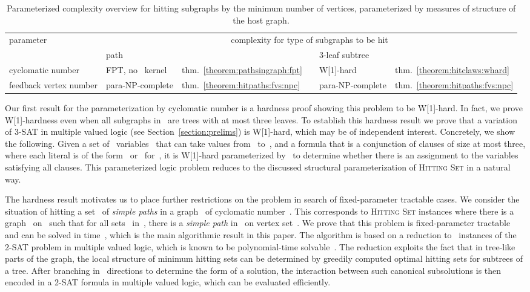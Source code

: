 \let\accentvec\vec  \documentclass{llncs}
\newcommand{\HittingSet}{\textsc{Hitting Set}\xspace}
\begin{document}
\begin{table}[t]
	\caption{Parameterized complexity overview for hitting subgraphs by the minimum number of vertices, parameterized by measures of structure of the host graph. }
	\centering
{
\begin{tabular}{@{}llllll@{}}
\toprule
parameter & \multicolumn{5}{c}{complexity for type of subgraphs to be hit} \\ 
\cmidrule{2-6}
& \multicolumn{2}{l}{path} & \phantom{abc} & \multicolumn{2}{l}{3-leaf subtree} \\ 
\midrule
cyclomatic number & FPT, no~ kernel & thm.~\ref{theorem:pathsingraph:fpt} & & W[1]-hard & thm.~\ref{theorem:hitclaws:whard} \\
feedback vertex number & para-NP-complete & thm.~\ref{theorem:hitpaths:fvs:npc} & & para-NP-complete & thm.~\ref{theorem:hitpaths:fvs:npc} \\
\bottomrule
\end{tabular}
\label{table:summary}
}
\end{table}

Our first result for the parameterization by cyclomatic number is a hardness proof showing this problem to be W[1]-hard. In fact, we prove W[1]-hardness even when all subgraphs in~ are trees with at most three leaves. To establish this hardness result we prove that a variation of 3-SAT in multiple valued logic (see Section~\ref{section:prelims}) is W[1]-hard, which may be of independent interest. Concretely, we show the following. Given a set of~ variables~ that can take values from~ to~, and a formula that is a conjunction of clauses of size at most three, where each literal is of the form~ or~ for~, it is W[1]-hard parameterized by~ to determine whether there is an assignment to the variables satisfying all clauses. This parameterized logic problem reduces to the discussed structural parameterization of \HittingSet in a natural way.

The hardness result motivates us to place further restrictions on the problem in search of fixed-parameter tractable cases. We consider the situation of hitting a set~ of \emph{simple paths} in a graph~ of cyclomatic number~. This corresponds to \HittingSet instances where there is a graph~ on~ such that for all sets~ in~, there is a \emph{simple path} in~ on vertex set~. We prove that this problem is fixed-parameter tractable and can be solved in time~, which is the main algorithmic result in this paper. The algorithm is based on a reduction to~ instances of the 2-SAT problem in multiple valued logic, which is known to be polynomial-time solvable~\cite{BejarHM01,Manya00}. The reduction exploits the fact that in tree-like parts of the graph, the local structure of minimum hitting sets can be determined by greedily computed optimal hitting sets for subtrees of a tree. After branching in~ directions to determine the form of a solution, the interaction between such canonical subsolutions is then encoded in a 2-SAT formula in multiple valued logic, which can be evaluated efficiently.
\end{document}
